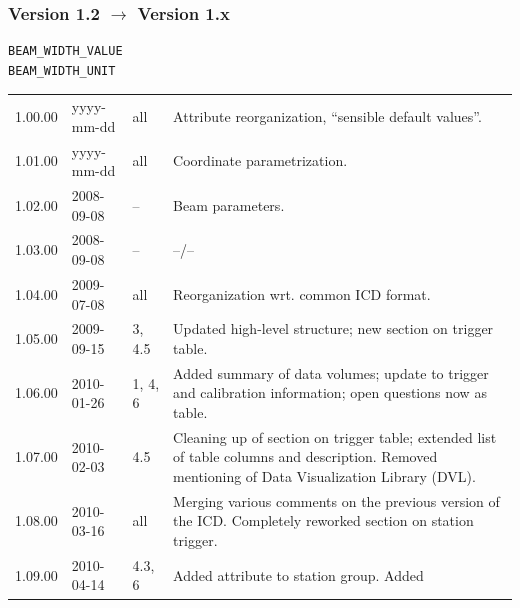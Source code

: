 \documentclass[a4paper,10pt,bibtotoc]{scrartcl}
\begin{document}
\subsubsection*{Version 1.2 $\rightarrow$ Version 1.x}

{\small
\begin{verbatim}
BEAM_WIDTH_VALUE
BEAM_WIDTH_UNIT
\end{verbatim}}


\begin{center}
  \tablelasttail{\hline}
  \begin{supertabular}{lllp{9.5cm}}
    1.00.00 & yyyy-mm-dd & all & Attribute reorganization, ``sensible default values''.\\
    1.01.00 & yyyy-mm-dd & all & Coordinate parametrization.\\
    1.02.00 & 2008-09-08 & -- & Beam parameters. \\
    1.03.00 & 2008-09-08 & --  & --/-- \\
    1.04.00 & 2009-07-08 & all & Reorganization wrt. common ICD format. \\
    1.05.00 & 2009-09-15 & 3, 4.5 & Updated high-level structure; new
    section on trigger table.\\
    1.06.00 & 2010-01-26 & 1, 4, 6 & Added summary of data volumes; update to
    trigger and calibration information; open questions now as
    table. \\
    1.07.00 & 2010-02-03 & 4.5 & Cleaning up of section on trigger table;
    extended list of table columns and description. Removed mentioning
    of Data Visualization Library (DVL). \\
    1.08.00 & 2010-03-16 & all & Merging various comments on the previous
    version of the ICD. Completely reworked section on station trigger. \\
    1.09.00 & 2010-04-14 & 4.3, 6 & Added attribute to station group. Added

\end{supertabular}
\end{center}
\end{document}
